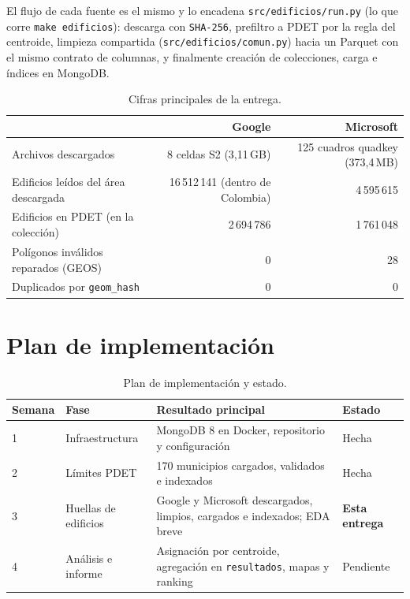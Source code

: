 \documentclass[11pt,a4paper]{article}
\newcommand{\campo}[1]{\texttt{#1}}
\begin{document}
El flujo de cada fuente es el mismo y lo encadena \campo{src/edificios/run.py}
(lo que corre \campo{make edificios}): descarga con \campo{SHA-256}, prefiltro
a PDET por la regla del centroide, limpieza compartida
(\campo{src/edificios/comun.py}) hacia un Parquet con el mismo contrato de
columnas, y finalmente creación de colecciones, carga e índices en MongoDB.

\begin{table}[H]
  \centering
  \caption{Cifras principales de la entrega.}
  \label{tab:resumen}
  \begin{tabularx}{\textwidth}{L r r}
    \toprule
    & Google & Microsoft \\
    \midrule
    Archivos descargados & 8 celdas S2 (3,11\,GB) & 125 cuadros quadkey (373,4\,MB) \\
    Edificios leídos del área descargada & 16\,512\,141 (dentro de Colombia) & 4\,595\,615 \\
    Edificios en PDET (en la colección) & 2\,694\,786 & 1\,761\,048 \\
    Polígonos inválidos reparados (GEOS) & 0 & 28 \\
    Duplicados por \campo{geom\_hash} & 0 & 0 \\
    \bottomrule
  \end{tabularx}
\end{table}

\section{Plan de implementación}
\label{sec:plan}

\begin{table}[H]
  \centering
  \caption{Plan de implementación y estado.}
  \label{tab:plan}
  \begin{tabularx}{\textwidth}{l L L l}
    \toprule
    Semana & Fase & Resultado principal & Estado \\
     & Infraestructura & MongoDB 8 en Docker, repositorio y configuración & Hecha \\
    2 & Límites PDET & 170 municipios cargados, validados e indexados & Hecha \\
    3 & Huellas de edificios & Google y Microsoft descargados, limpios, cargados e
        indexados; EDA breve & \textbf{Esta entrega} \\
    4 & Análisis e informe & Asignación por centroide, agregación en
        \campo{resultados}, mapas y ranking & Pendiente \\
    \bottomrule
  \end{tabularx}
\end{table}
\end{document}
